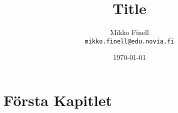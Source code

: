 \documentclass[a4paper,12pt]{article}
\author{Mikko Finell \\ \texttt{mikko.finell@edu.novia.fi}}
\title{Title}
\date{\today}
\begin{document}
\maketitle

\section*{Första Kapitlet}

 

\end{document}
